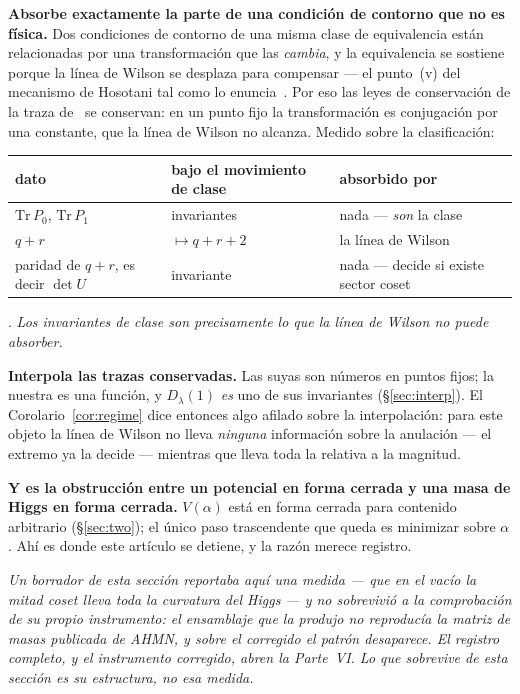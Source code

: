 \documentclass[11pt,a4paper]{article}
\newcommand{\Dl}{D_\lambda}
\begin{document}
\textbf{Absorbe exactamente la parte de una condición de contorno que no es física.} Dos condiciones
de contorno de una misma clase de equivalencia están relacionadas por una transformación que las
\emph{cambia}, y la equivalencia se sostiene porque la línea de Wilson se desplaza para compensar ---
el punto~(v) del mecanismo de Hosotani tal como lo enuncia~\cite{HHK}. Por eso las leyes de
conservación de la traza de~\cite{TI1,TI2} se conservan: en un punto fijo la transformación es
conjugación por una constante, que la línea de Wilson no alcanza. Medido sobre la clasificación:

\begin{center}\small
{}
\begin{tabular}{lll}
\toprule
\rowcolor{hdrblue!14}dato & bajo el movimiento de clase & absorbido por\\
\midrule
$\mathrm{Tr}\,P_0$, $\mathrm{Tr}\,P_1$ & invariantes & nada --- \emph{son} la clase\\
$q+r$ & $\mapsto q+r+2$ & la línea de Wilson\\
paridad de $q+r$, es decir $\det U$ & invariante & nada --- decide si existe sector coset\\
\bottomrule
\end{tabular}
\end{center}

. \emph{Los invariantes de clase son precisamente lo que la
línea de Wilson no puede absorber.}

\textbf{Interpola las trazas conservadas.} Las suyas son números en puntos fijos; la nuestra es una
función, y $\Dl(1)$ \emph{es} uno de sus invariantes (\S\ref{sec:interp}). El
Corolario~\ref{cor:regime} dice entonces algo afilado sobre la interpolación: para este objeto la
línea de Wilson no lleva \emph{ninguna} información sobre la anulación --- el extremo ya la decide
--- mientras que lleva toda la relativa a la magnitud.

\textbf{Y es la obstrucción entre un potencial en forma cerrada y una masa de Higgs en forma
cerrada.} $V(\alpha)$ está en forma cerrada para contenido arbitrario (\S\ref{sec:two}); el único
paso trascendente que queda es minimizar sobre $\alpha$. Ahí es donde este artículo se detiene, y la
razón merece registro.

\emph{Un borrador de esta sección reportaba aquí una medida --- que en el vacío la mitad coset lleva
toda la curvatura del Higgs --- y no sobrevivió a la comprobación de su propio instrumento: el
ensamblaje que la produjo no reproducía la matriz de masas publicada de AHMN, y sobre el corregido el
patrón desaparece. El registro completo, y el instrumento corregido, abren la Parte~VI. Lo que
sobrevive de esta sección es su estructura, no esa medida.}
\end{document}
